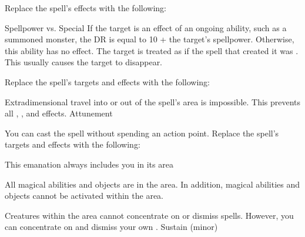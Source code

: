 Replace the spell's effects with the following:
\begin{spellcontent}
\begin{augmenteffects}
\begin{spellattack}{Spellpower vs. Special}
\spellspecial
If the target is an effect of an ongoing  ability, such as a summoned monster, the DR is equal to 10 + the target's spellpower.
Otherwise, this ability has no effect.
\spellsuccess
The target is treated as if the spell that created it was .
This usually causes the target to disappear.
\end{spellattack}
\end{augmenteffects}
\end{spellcontent}
Replace the spell's targets and effects with the following:
\begin{spellcontent}
\begin{augmenttargetinginfo}
\end{augmenttargetinginfo}
\begin{augmenteffects}
\spelleffect
Extradimensional travel into or out of the spell's area is impossible.
This prevents all , , and  effects.
\spelldur Attunement
\end{augmenteffects}
\end{spellcontent}
You can cast the spell without spending an action point.
Replace the spell's targets and effects with the following:
\begin{spellcontent}
\begin{augmenttargetinginfo}
\spellspecial This emanation always includes you in its area
\end{augmenttargetinginfo}
\begin{augmenteffects}
\spelleffect
All magical abilities and objects are  in the area.
In addition, magical abilities and objects cannot be activated within the area.
\par Creatures within the area cannot concentrate on or dismiss spells. However, you can concentrate on and dismiss your own .
\spelldur Sustain (minor)
\end{augmenteffects}
\end{spellcontent}
